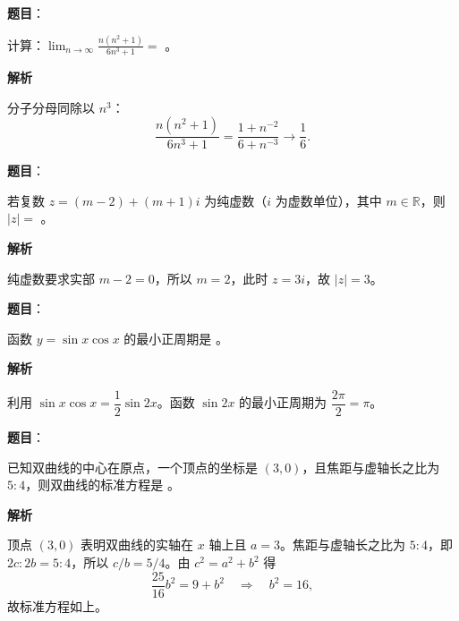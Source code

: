 \begin{answer}

\textbf{题目}：

计算：$\displaystyle\lim_{n\to\infty}\frac{n(n^2+1)}{6n^3+1}=$ \gkblank{}。

\textbf{解析}

分子分母同除以 $n^3$：
\nopagebreak[4]
\[
\frac{n(n^2+1)}{6n^3+1}
=\frac{1+n^{-2}}{6+n^{-3}}\longrightarrow\frac16.
\]


\end{answer}
\begin{answer}

\textbf{题目}：

若复数 $z=(m-2)+(m+1)i$ 为纯虚数（$i$ 为虚数单位），其中 $m\in\mathbb R$，则 $|z|=$ \gkblank{}。

\textbf{解析}

纯虚数要求实部 $m-2=0$，所以 $m=2$，此时 $z=3i$，故 $|z|=3$。


\end{answer}
\begin{answer}

\textbf{题目}：

函数 $y=\sin x\cos x$ 的最小正周期是 \gkblank{}。

\textbf{解析}

利用 $\sin x\cos x=\dfrac12\sin2x$。函数 $\sin2x$ 的最小正周期为 $\dfrac{2\pi}{2}=\pi$。


\end{answer}
\begin{answer}

\textbf{题目}：

已知双曲线的中心在原点，一个顶点的坐标是 $(3,0)$，且焦距与虚轴长之比为 $5:4$，则双曲线的标准方程是 \gkblank{}。

\textbf{解析}

顶点 $(3,0)$ 表明双曲线的实轴在 $x$ 轴上且 $a=3$。焦距与虚轴长之比为 $5:4$，即 $2c:2b=5:4$，所以 $c/b=5/4$。由 $c^2=a^2+b^2$ 得
\nopagebreak[4]
\[
\frac{25}{16}b^2=9+b^2\quad\Longrightarrow\quad b^2=16,
\]
故标准方程如上。


\end{answer}
